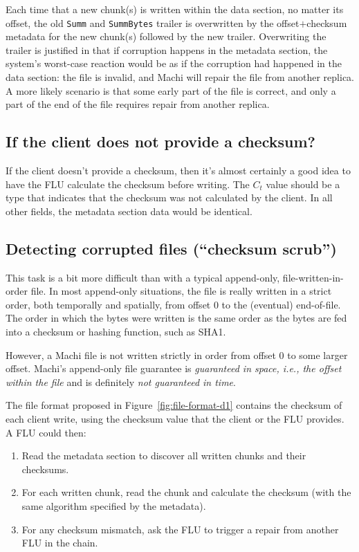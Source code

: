 \documentclass[preprint,10pt]{sigplanconf}
\begin{document}
Each time that a new chunk(s) is written within the data section, no
matter its offset, the old {\tt Summ} and {\tt SummBytes} trailer is
overwritten by the offset$+$checksum metadata for the new chunk(s)
followed by the new trailer.  Overwriting the trailer is justified in
that if corruption happens in the metadata section, the
system's worst-case reaction would be as if
the corruption had happened in the data section: the file
is invalid, and Machi will repair the file from another replica.
A more likely scenario is that some early part of the file is correct,
and only a part of the end of the file requires repair from another
replica.

\subsection{If the client does not provide a checksum?}

If the client doesn't provide a checksum, then it's almost certainly a
good idea to have the FLU calculate the checksum before writing.  The
$C_t$ value should be a type that indicates that the checksum was not
calculated by the client.  In all other fields, the metadata section
data would be identical.

\subsection{Detecting corrupted files (``checksum scrub'')}
\label{sub:detecting-corrupted}

This task is a bit more difficult than with a typical append-only,
file-written-in-order file.  In most append-only situations, the file
is really written in a strict order, both temporally and spatially,
from offset 0 to the (eventual)
end-of-file.  The order in which the bytes were written is the same
order as the bytes are fed into a checksum or
hashing function, such as SHA1.

However, a Machi file is not written strictly in order from offset 0
to some larger offset.  Machi's append-only file guarantee is
{\em guaranteed in space, i.e., the offset within the file} and is
definitely {\em not guaranteed in time}.

The file format proposed in Figure~\ref{fig:file-format-d1}
contains the checksum of each client write, using the checksum value
that the client or the FLU provides.  A FLU could then:

\begin{enumerate}
\item Read the metadata section to discover all written chunks and
  their checksums.
\item For each written chunk, read the chunk and calculate the
  checksum (with the same algorithm specified by the metadata).
\item For any checksum mismatch, ask the FLU to trigger a repair from
  another FLU in the chain.
\end{enumerate}
\end{document}
